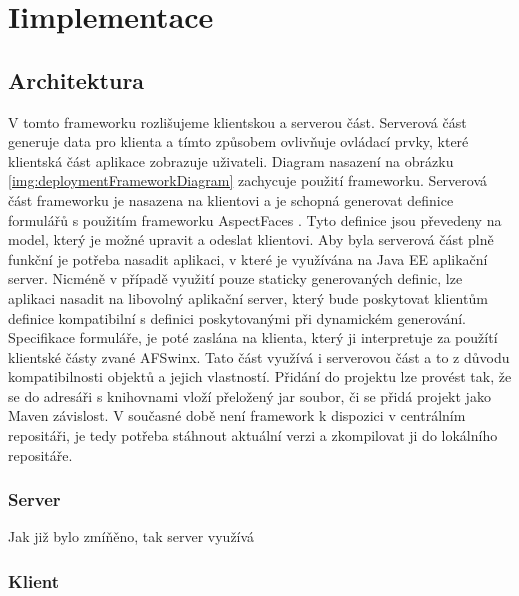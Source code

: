 \chapter{Iimplementace} 
\section{Architektura}
V tomto frameworku rozlišujeme klientskou a serverou část. Serverová část generuje data pro klienta a tímto způsobem ovlivňuje ovládací prvky, které klientská část aplikace zobrazuje uživateli. Diagram nasazení na obrázku \ref{img:deploymentFrameworkDiagram} zachycuje použití frameworku. Serverová část frameworku je nasazena na klientovi a je schopná generovat definice formulářů s použitím frameworku AspectFaces \cite{aspectFaces}. Tyto definice jsou převedeny na model, který je možné upravit a odeslat klientovi. Aby byla serverová část plně funkční je potřeba nasadit aplikaci, v které je využívána na Java EE aplikační server. Nicméně v případě využití pouze staticky generovaných definic, lze aplikaci nasadit na libovolný aplikační server, který bude poskytovat klientům definice kompatibilní s definici poskytovanými při dynamickém generování. Specifikace formuláře, je poté zaslána na klienta, který ji interpretuje za použítí klientské částy zvané AFSwinx. Tato část využívá i serverovou část a to z důvodu kompatibilnosti objektů a jejich vlastností. Přidání do projektu lze provést tak, že se do adresáři s knihovnami vloží přeložený jar soubor, či se přidá projekt jako Maven závislost. V současné době není framework k dispozici v centrálním repositáři, je tedy potřeba stáhnout aktuální verzi a zkompilovat ji do lokálního repositáře.  
\subsection{Server}
Jak již bylo zmíňěno, tak server využívá 
\subsection{Klient}
